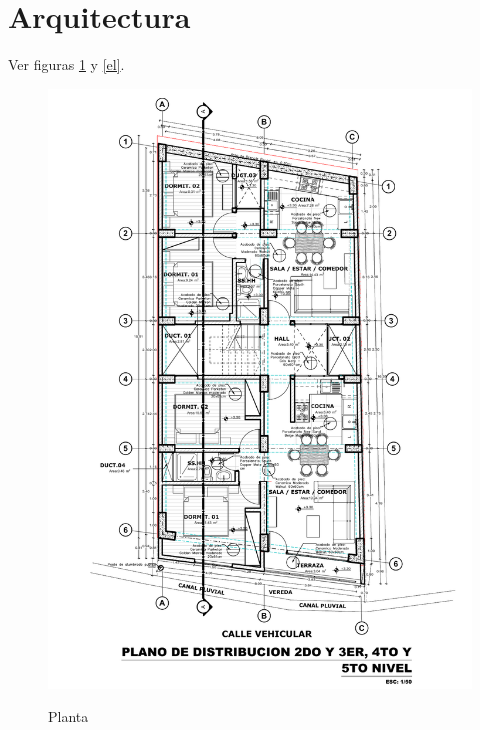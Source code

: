 \documentclass[12pt]{article}
\begin{document}
\section{Arquitectura}
Ver figuras \ref{pl} y \ref{el}.
\begin{figure}[h!]
    \centering
    \caption{Planta}
    \includegraphics[scale=0.7]{IMAGENES/Plano.pdf}
    \label{pl}
\end{figure}
\end{document}
